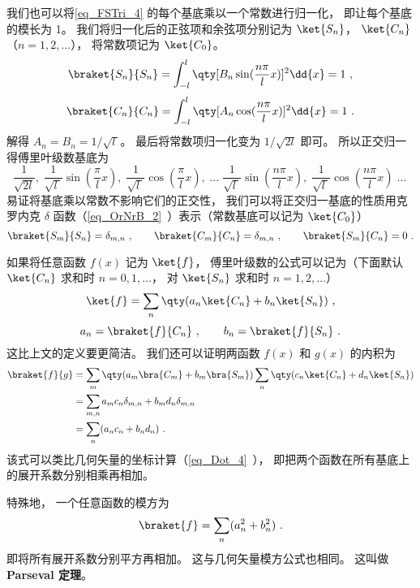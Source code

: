 我们也可以将\autoref{eq_FSTri_4} 的每个基底乘以一个常数进行归一化， 即让每个基底的模长为 1。 我们将归一化后的正弦项和余弦项分别记为 $\ket{S_n}$， $\ket{C_n}$ （$n = 1, 2,\dots$）， 将常数项记为 $\ket{C_0}$。
\begin{equation}
\braket{S_n}{S_n} = \int_{-l}^l \qty[B_n \sin(\frac{n\pi}{l}x)]^2 \dd{x} = 1~,
\end{equation}
\begin{equation}
\braket{C_n}{C_n} = \int_{-l}^l \qty[A_n \cos(\frac{n\pi}{l}x)]^2 \dd{x} = 1~.
\end{equation}
解得 $A_n = B_n = 1/\sqrt{l\ }$。 最后将常数项归一化变为 $1/\sqrt{2l}$ 即可。 所以正交归一得傅里叶级数基底为
\begin{equation}
\frac{1}{\sqrt{2l}},\;   \frac{1}{\sqrt{l\ }}\sin(\frac{\pi}{l} x),\;   \frac{1}{\sqrt{l\ }}\cos(\frac{\pi}{l} x),\;   \dots\;  \frac{1}{\sqrt{l\ }}\sin(\frac{n\pi}{l} x),\;   \frac{1}{\sqrt{l\ }}\cos(\frac{n\pi}{l} x)\;   \dots~
\end{equation}
易证将基底乘以常数不影响它们的正交性， 我们可以将正交归一基底的性质用克罗内克 $\delta$ 函数（\autoref{eq_OrNrB_2}~）表示（常数基底可以记为 $\ket{C_0}$）
\begin{equation}
\braket{S_m}{S_n} = \delta_{m,n}~,
\qquad
\braket{C_m}{C_n} = \delta_{m, n}~,
\qquad
\braket{S_m}{C_n} = 0~.
\end{equation}

如果将任意函数 $f(x)$ 记为 $\ket{f}$， 傅里叶级数的公式可以记为（下面默认 $\ket{C_n}$ 求和时 $n = 0, 1, \dots$， 对 $\ket{S_n}$ 求和时 $n = 1, 2, \dots$）
\begin{equation}
\ket{f} = \sum_n \qty(a_n \ket{C_n} + b_n \ket{S_n})~,
\end{equation}
\begin{equation}
a_n = \braket{f}{C_n}~,
\qquad
b_n = \braket{f}{S_n}~.
\end{equation}
这比上文的定义要更简洁。 我们还可以证明两函数 $f(x)$ 和 $g(x)$ 的内积为
\begin{equation}
\begin{aligned}
\braket{f}{g} &= \sum_m \qty(a_m \bra{C_m} + b_m \bra{S_m}) \sum_n \qty(c_n \ket{C_n} + d_n \ket{S_n})\\
&= \sum_{m, n} a_m c_n \delta_{m, n} + b_m d_n \delta_{m, n}\\
&= \sum_n (a_n c_n + b_n d_n)~.
\end{aligned}
\end{equation}
该式可以类比几何矢量的坐标计算（\autoref{eq_Dot_4}~）， 即把两个函数在所有基底上的展开系数分别相乘再相加。

特殊地， 一个任意函数的模方为
\begin{equation}
\braket{f} = \sum_n (a_n^2 + b_n^2)~.
\end{equation}
即将所有展开系数分别平方再相加。 这与几何矢量模方公式也相同。 这叫做 \textbf{Parseval 定理}。
